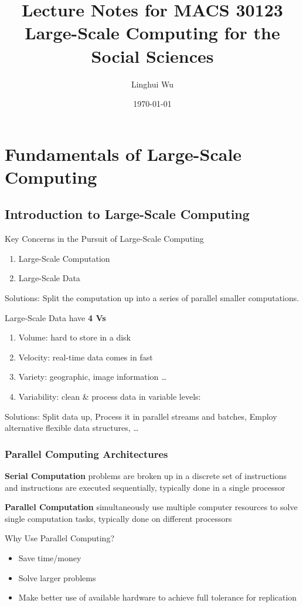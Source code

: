 \documentclass{article}
\title{Lecture Notes for MACS 30123 \\ Large-Scale Computing for the Social Sciences}
\author{Linghui Wu}
\date{\today}
\begin{document}
\maketitle
\tableofcontents
\newpage

\section{Fundamentals of Large-Scale Computing}

\subsection{Introduction to Large-Scale Computing}

Key Concerns in the Pursuit of Large-Scale Computing
\begin{enumerate}
    \item Large-Scale Computation
    \item Large-Scale Data
\end{enumerate}

Solutions: Split the computation up into a series of parallel smaller computations.

Large-Scale Data have \textbf{4 Vs}
\begin{enumerate}
    \item Volume: hard to store in a disk
    \item Velocity: real-time data comes in fast
    \item Variety: geographic, image information … 
    \item Variability: clean \& process data in variable levels:
\end{enumerate}

Solutions: Split data up, Process it in parallel streams and batches, Employ alternative flexible data structures, …

\subsubsection{Parallel Computing Architectures}

\textbf{Serial Computation} problems are broken up in a discrete set of instructions and instructions are executed sequentially, typically done in a single processor

\textbf{Parallel Computation} simultaneously use multiple computer resources to solve single computation tasks, typically done on different processors

Why Use Parallel Computing?
\begin{itemize}
    \item Save time/money
    \item Solve larger problems
    \item Make better use of available hardware to achieve full tolerance for replication
\end{itemize}
\end{document}
